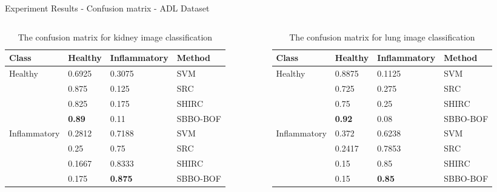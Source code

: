 \documentclass [9pt,times] {beamer}
\begin{document}
\begin{frame}{Experiment Results - Confusion matrix - ADL Dataset}
\scriptsize
\begin{columns}
\begin{column}{5cm}
\begin{table}

\scriptsize
    \caption{The confusion matrix for kidney image classification}
    \label{tab:cm_kid}
 
{\renewcommand{\arraystretch}{1}
\begin{tabular}{|p{0.4in}|p{0.3in}|p{0.4in}|p{0.45in}|}

    \hline
Class    &    Healthy    &    Inflammatory    &    Method    \\
\hline
Healthy    &    0.6925    &    0.3075    &    SVM    \\
    &    0.875    &    0.125    &    SRC    \\
    &    0.825    &    0.175    &    SHIRC    \\
    &    \textbf{0.89}    &    0.11    &    SBBO-BOF    \\
\hline
Inflammatory    &    0.2812    &    0.7188    &    SVM    \\
    &    0.25    &    0.75    &    SRC    \\
    &    0.1667    &    0.8333    &    SHIRC    \\
    &    0.175    &    \textbf{0.875}    &    SBBO-BOF    \\

\hline
 \end{tabular}}
\end{table}
\end{column}
\begin{column}{5cm}
\begin{table}

\scriptsize
    \caption{The confusion matrix for lung image classification}
    \label{tab:cm_lg}
{\renewcommand{\arraystretch}{1}    
\begin{tabular}{|p{0.4in}|p{0.3in}|p{0.4in}|p{0.45in}|}

    \hline
Class    &    Healthy    &    Inflammatory    &    Method    \\
\hline
Healthy    &    0.8875    &    0.1125    &    SVM    \\
    &    0.725    &    0.275    &    SRC    \\
    &    0.75    &    0.25    &    SHIRC    \\
    &\textbf{    0.92    }&    0.08    &    SBBO-BOF    \\
\hline
Inflammatory    &    0.372    &    0.6238    &    SVM    \\
    &    0.2417    &    0.7853    &    SRC    \\
    &    0.15    &    0.85    &    SHIRC    \\
    &    0.15    &\textbf{    0.85    }&    SBBO-BOF    \\



\end{tabular}}
\end{table}
\end{column}
\end{columns}
\end{frame}
\end{document}
